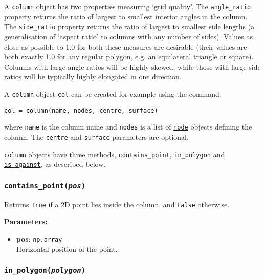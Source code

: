 A \texttt{column} object has two properties measuring `grid quality'.  The \texttt{angle\_ratio} property returns the ratio of largest to smallest interior angles in the column.  The \texttt{side\_ratio} property returns the ratio of largest to smallest side lengths (a generalisation of `aspect ratio' to columns with any number of sides).  Values as close as possible to 1.0 for both these measures are desirable (their values are both exactly 1.0 for any regular polygon, e.g. an equilateral triangle or square).  Columns with large angle ratios will be highly skewed, while those with large side ratios will be typically highly elongated in one direction.

A \texttt{column} object \texttt{col} can be created for example using the command:

\begin{lstlisting}
col = column(name, nodes, centre, surface)
\end{lstlisting}

where \texttt{name} is the column name and \texttt{nodes} is a list of \hyperref[nodeobjects]{\texttt{node}} objects defining the column.  The \texttt{centre} and \texttt{surface} parameters are optional.

\texttt{column} objects have three methods, \hyperref[sec:column:contains_point]{\texttt{contains\_point}}, \hyperref[sec:column:in_polygon]{\texttt{in\_polygon}} and \hyperref[sec:column:is_against]{\texttt{is\_against}}, as described below.

\begin{snugshade}
\subsubsection{\texttt{contains\_point(\emph{pos})}}
\end{snugshade}
\label{sec:column:contains_point}

Returns \texttt{True} if a 2D point lies inside the column, and \texttt{False} otherwise.

\textbf{Parameters:}
\begin{itemize}
\item \textbf{pos}: \texttt{np.array}\\
  Horizontal position of the point.
\end{itemize}

\begin{snugshade}
\subsubsection{\texttt{in\_polygon(\emph{polygon})}}
\end{snugshade}
\label{sec:column:in_polygon}

